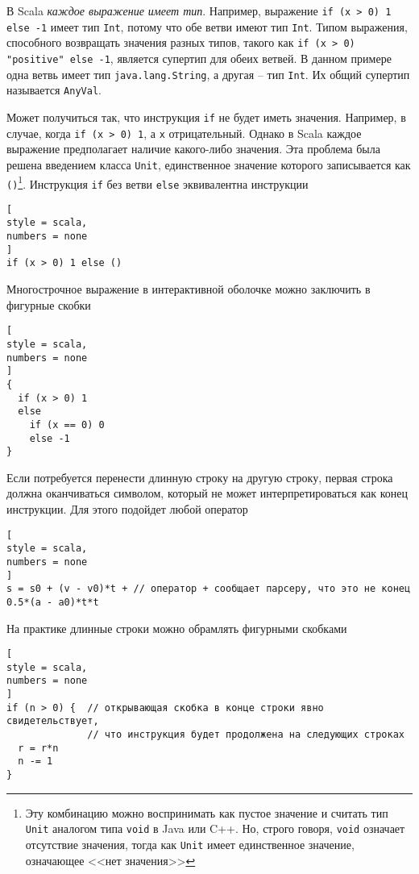 \documentclass[%
	11pt,
	a4paper,
	utf8,
		]{article}
\begin{document}
В Scala \emph{каждое выражение имеет тип}. Например, выражение \verb|if (x > 0) 1 else -1| имеет тип \texttt{Int}, потому что обе ветви имеют тип \texttt{Int}. Типом выражения, способного возвращать значения разных типов, такого как \texttt{if (x > 0) "positive" else -1}, является супертип для обеих ветвей. В данном примере одна ветвь имеет тип \texttt{java.lang.String}, а другая -- тип \texttt{Int}. Их общий супертип называется \texttt{AnyVal}.

Может получиться так, что инструкция \texttt{if} не будет иметь значения. Например, в случае, когда \texttt{if (x > 0) 1}, а \texttt{x} отрицательный. Однако в Scala каждое выражение предполагает наличие какого-либо значения. Эта проблема была решена введением класса \texttt{Unit}, единственное значение которого записывается как \verb|()|\footnote{Эту комбинацию можно воспринимать как пустое значение и считать тип \texttt{Unit} аналогом типа \texttt{void} в Java или C++. Но, строго говоря, \texttt{void} означает отсутствие значения, тогда как \texttt{Unit} имеет единственное значение, означающее <<нет значения>> }. Инструкция \texttt{if} без ветви \texttt{else} эквивалентна инструкции
\begin{lstlisting}[
style = scala,
numbers = none
]
if (x > 0) 1 else ()
\end{lstlisting}

Многострочное выражение в интерактивной оболочке можно заключить в фигурные скобки
\begin{lstlisting}[
style = scala,
numbers = none
]
{
  if (x > 0) 1
  else
    if (x == 0) 0
    else -1
}
\end{lstlisting}

Если потребуется перенести длинную строку на другую строку, первая строка должна оканчиваться символом, который не может интерпретироваться как конец инструкции. Для этого подойдет любой оператор
\begin{lstlisting}[
style = scala,
numbers = none
]
s = s0 + (v - v0)*t + // оператор + сообщает парсеру, что это не конец
0.5*(a - a0)*t*t
\end{lstlisting}

На практике длинные строки можно обрамлять фигурными скобками
\begin{lstlisting}[
style = scala,
numbers = none
]
if (n > 0) {  // открывающая скобка в конце строки явно свидетельствует,
              // что инструкция будет продолжена на следующих строках
  r = r*n
  n -= 1
}
\end{lstlisting}
\end{document}
